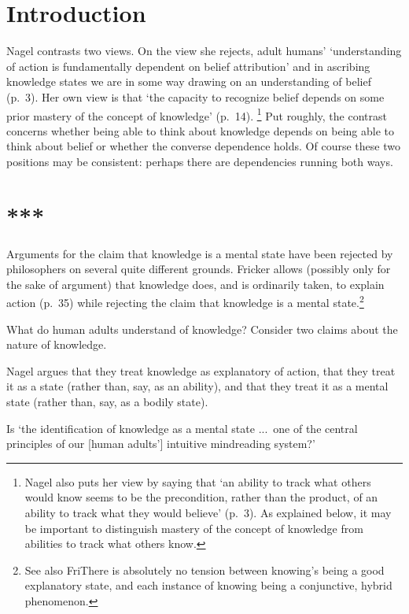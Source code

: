 \documentclass[11pt,a4paper]{extarticle}
\begin{document}
\section{Introduction}
Nagel contrasts two views.
On the view she rejects, adult humans' `understanding of action is fundamentally dependent on belief attribution' and in ascribing knowledge states we are in some way drawing on an understanding of belief (p.\ 3).
Her own view is that `the capacity to recognize belief depends on some prior mastery of the concept of knowledge' (p.\ 14).%
\footnote{
Nagel also puts her view by saying that `an ability to track what others would know seems to be the precondition, rather than the product, of an ability to track what they would believe' (p.\ 3).
As explained below, it may be important to distinguish mastery of the concept of knowledge from abilities to track what others know.
}
Put roughly, the contrast concerns whether being able to think about knowledge depends on being able to think about belief or whether the converse dependence holds.
Of course these two positions may be consistent: perhaps there are dependencies running both ways.  





\section{***}
Arguments for the claim that knowledge is a mental state have been rejected by philosophers on several quite different grounds.
Fricker allows (possibly only for the sake of argument) that knowledge does, and is ordinarily taken, to explain action (p.\ 35) while rejecting the claim that knowledge is a mental state.\footnote{
See also FriThere is absolutely no tension between knowing's being a good explanatory state, and each instance of knowing being a conjunctive, hybrid phenomenon. 
}
%

What do human adults understand of knowledge?
Consider two claims about the nature of knowledge.



Nagel argues that they treat knowledge as explanatory of action, that they treat it as a state (rather than, say, as an ability), and that they treat it as a mental state (rather than, say, as a bodily state).
 

Is `the identification of knowledge as a mental state ...\ one of the central principles of our [human adults'] intuitive mindreading system?'
\end{document}
